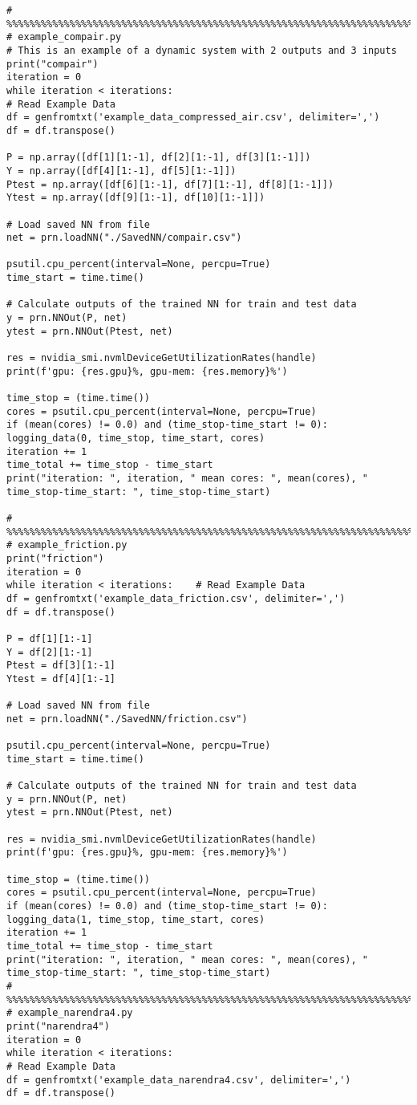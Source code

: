 \begin{lstlisting}
# %%%%%%%%%%%%%%%%%%%%%%%%%%%%%%%%%%%%%%%%%%%%%%%%%%%%%%%%%%%%%%%%%%%%%%%%%%%%%%%%%%%%%%%
# example_compair.py
# This is an example of a dynamic system with 2 outputs and 3 inputs
print("compair")
iteration = 0
while iteration < iterations:
# Read Example Data
df = genfromtxt('example_data_compressed_air.csv', delimiter=',')
df = df.transpose()

P = np.array([df[1][1:-1], df[2][1:-1], df[3][1:-1]])
Y = np.array([df[4][1:-1], df[5][1:-1]])
Ptest = np.array([df[6][1:-1], df[7][1:-1], df[8][1:-1]])
Ytest = np.array([df[9][1:-1], df[10][1:-1]])

# Load saved NN from file
net = prn.loadNN("./SavedNN/compair.csv")

psutil.cpu_percent(interval=None, percpu=True)
time_start = time.time()

# Calculate outputs of the trained NN for train and test data
y = prn.NNOut(P, net)
ytest = prn.NNOut(Ptest, net)

res = nvidia_smi.nvmlDeviceGetUtilizationRates(handle)
print(f'gpu: {res.gpu}%, gpu-mem: {res.memory}%')

time_stop = (time.time())
cores = psutil.cpu_percent(interval=None, percpu=True)
if (mean(cores) != 0.0) and (time_stop-time_start != 0):
logging_data(0, time_stop, time_start, cores)
iteration += 1
time_total += time_stop - time_start
print("iteration: ", iteration, " mean cores: ", mean(cores), " time_stop-time_start: ", time_stop-time_start)

# %%%%%%%%%%%%%%%%%%%%%%%%%%%%%%%%%%%%%%%%%%%%%%%%%%%%%%%%%%%%%%%%%%%%%%%%%%%%%%%%%%%%%%%
# example_friction.py
print("friction")
iteration = 0
while iteration < iterations:    # Read Example Data
df = genfromtxt('example_data_friction.csv', delimiter=',')
df = df.transpose()

P = df[1][1:-1]
Y = df[2][1:-1]
Ptest = df[3][1:-1]
Ytest = df[4][1:-1]

# Load saved NN from file
net = prn.loadNN("./SavedNN/friction.csv")

psutil.cpu_percent(interval=None, percpu=True)
time_start = time.time()

# Calculate outputs of the trained NN for train and test data
y = prn.NNOut(P, net)
ytest = prn.NNOut(Ptest, net)

res = nvidia_smi.nvmlDeviceGetUtilizationRates(handle)
print(f'gpu: {res.gpu}%, gpu-mem: {res.memory}%')

time_stop = (time.time())
cores = psutil.cpu_percent(interval=None, percpu=True)
if (mean(cores) != 0.0) and (time_stop-time_start != 0):
logging_data(1, time_stop, time_start, cores)
iteration += 1
time_total += time_stop - time_start
print("iteration: ", iteration, " mean cores: ", mean(cores), " time_stop-time_start: ", time_stop-time_start)
# %%%%%%%%%%%%%%%%%%%%%%%%%%%%%%%%%%%%%%%%%%%%%%%%%%%%%%%%%%%%%%%%%%%%%%%%%%%%%%%%%%%%%%%
# example_narendra4.py
print("narendra4")
iteration = 0
while iteration < iterations:
# Read Example Data
df = genfromtxt('example_data_narendra4.csv', delimiter=',')
df = df.transpose()


\end{lstlisting}
